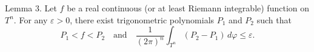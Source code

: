 Lemma 3. Let $f$ be a real continuous (or at least Riemann integrable) function on $T^n$. For any $\varepsilon > 0$, there exist trigonometric polynomials $P_1$ and $P_2$ such that
$$P_1 < f < P_2 \quad \text{and} \quad \frac{1}{(2\pi)^n} \int_{T^n} (P_2 - P_1) \, d\varphi \leq \varepsilon.$$
